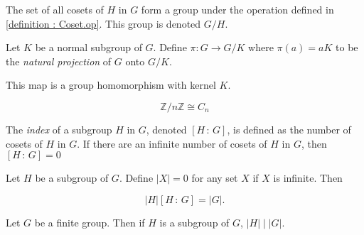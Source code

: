\begin{theorem}
    \label{theorem : quotientGroup}
    The set of all cosets of $H$ in $G$ form a group under the operation defined
    in \ref{definition : Coset.op}. This group is denoted $G/H$.
\end{theorem}

\begin{definition}
    \label{definition : quotNaturalProj}
    Let $K$ be a normal subgroup of $G$. Define $\pi : G \rightarrow G/K$ where
    $\pi(a) = aK$ to be the \emph{natural projection} of $G$ onto $G/K$.

    This map is a group homomorphism with kernel $K$.
\end{definition}

\begin{theorem}
    \label{theorem : int_mod_iso_cyclic}

    \begin{equation*}
        \mathbb{Z}/n\mathbb{Z} \cong C_n
    \end{equation*}
\end{theorem}

\begin{definition}
    \label{definition : Index}
    The \emph{index} of a subgroup $H$ in $G$, denoted $[H\,:\,G]$, is defined
    as the number of cosets of $H$ in $G$. If there are an infinite number of
    cosets of $H$ in $G$, then $[H\,:\,G] = 0$
\end{definition}

\begin{theorem}
    \label{theorem : card_subgroup_mul_index_eq_card_group}
    Let $H$ be a subgroup of $G$. Define $|X| = 0$ for any set $X$ if $X$ is
    infinite. Then

    \begin{equation*}
        |H|[H\,:\,G] = |G|.
    \end{equation*}
\end{theorem}

\begin{corollary}
    \label{theorem : card_subgroup_dvd_card_group_of_finite_group}
    Let $G$ be a finite group. Then if $H$ is a subgroup of $G$, $|H| \mid |G|$.
\end{corollary}

